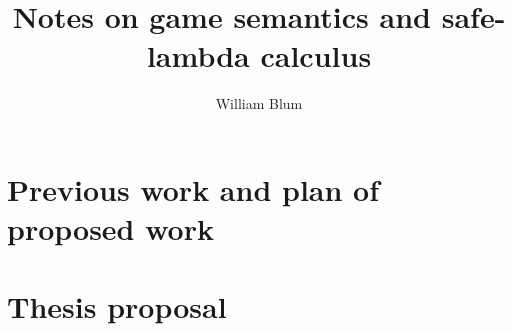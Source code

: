 \documentclass[nocenter,sfbold]{thesis}
\author{William Blum}
\title{Notes on game semantics and safe-lambda calculus}
\begin{document}
\maketitle \tableofcontents

\part{Previous work and plan of proposed work}



\part{Thesis proposal}











         {\protect{}}
\end{document}
